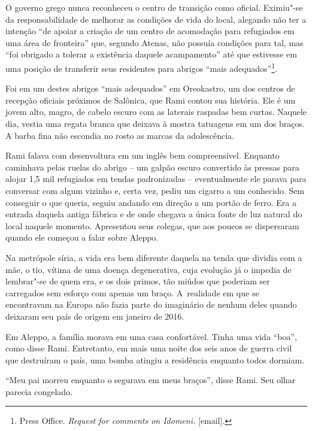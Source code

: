 
O governo grego nunca reconheceu o centro de transição como oficial.
Eximiu"-se da responsabilidade de melhorar as condições de vida do local,
alegando não ter a intenção ``de apoiar a criação de um centro de
acomodação para refugiados em uma área de fronteira'' que, segundo
Atenas, não possuía condições para tal, mas ``foi obrigado a tolerar a
existência daquele acampamento'' até que estivesse em uma posição de
transferir seus residentes para abrigos ``mais
adequados''\footnote{ Press Office. \emph{Request for comments on
Idomeni}\emph{.} {[}email{]}.}.

Foi em um destes abrigos ``mais adequados'' em Oreokastro, um dos
centros de recepção oficiais próximos de Salônica, que Rami contou
sua história. Ele é um jovem alto, magro, de cabelo escuro com as
laterais raspadas bem curtas. Naquele dia, vestia uma regata branca 
que deixava à mostra tatuagens em um dos braços. A barba fina não 
escondia no rosto as marcas da adolescência.

Rami falava com desenvoltura em um inglês bem compreensível. Enquanto
caminhava pelas ruelas do abrigo -- um galpão escuro convertido às pressas 
para alojar 1,5 mil refugiados em tendas padronizadas -- eventualmente ele 
parava para conversar com algum vizinho e, certa vez, pediu um cigarro a um 
conhecido. Sem conseguir o que queria, seguiu andando em direção a um portão 
de ferro. Era a entrada daquela antiga fábrica e de onde chegava a única fonte 
de luz natural do local naquele momento. Apresentou seus colegas, que aos poucos 
se dispersaram quando ele começou a falar sobre Aleppo.


Na metrópole síria, a vida era bem diferente daquela na tenda que dividia
com a mãe, o tio, vítima de uma doença degenerativa, cuja evolução já o 
impedia de lembrar"-se de quem era, e os dois primos, tão miúdos que poderiam ser
carregados sem esforço com apenas um braço. A~realidade em que se
encontravam na Europa não fazia parte do imaginário de nenhum deles
quando deixaram seu país de origem em janeiro de 2016.

Em Aleppo, a família morava em uma casa confortável. Tinha uma vida
``boa'', como disse Rami. Entretanto, em mais uma noite dos seis anos de guerra
civil que destruíram o país, uma bomba atingiu a residência enquanto todos
dormiam.

``Meu pai morreu enquanto o segurava em meus braços'', disse Rami. Seu
olhar parecia congelado.

